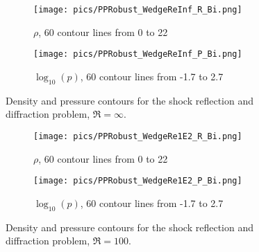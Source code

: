 \begin{figure}[htbp!]
    \centering
    \begin{subfigure}{0.5\textwidth}
        \texttt{[image: pics/PPRobust\_WedgeReInf\_R\_Bi.png]}
        \caption[]{$\rho$, 60 contour lines from 0 to 22}
    \end{subfigure}\hfill
    \begin{subfigure}{0.5\textwidth}
        \texttt{[image: pics/PPRobust\_WedgeReInf\_P\_Bi.png]}
        \caption[]{$\log_{10}(p)$, 60 contour lines from -1.7 to 2.7}
    \end{subfigure}
    \caption{Density and pressure contours for the shock reflection and diffraction problem, $\Re=\infty$.}
    \label{fig:wedgeReInf}
\end{figure}

\begin{figure}[htbp!]
    \centering
    \begin{subfigure}{0.5\textwidth}
        \texttt{[image: pics/PPRobust\_WedgeRe1E2\_R\_Bi.png]}
        \caption[]{$\rho$, 60 contour lines from 0 to 22}
    \end{subfigure}\hfill
    \begin{subfigure}{0.5\textwidth}
        \texttt{[image: pics/PPRobust\_WedgeRe1E2\_P\_Bi.png]}
        \caption[]{$\log_{10}(p)$, 60 contour lines from -1.7 to 2.7}
    \end{subfigure}
    \caption{Density and pressure contours for the shock reflection and diffraction problem, $\Re=100$.}
    \label{fig:wedgeRe1E2}
\end{figure}

\subsection{}

